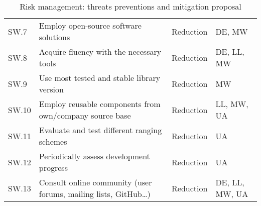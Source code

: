 \begin{table}[H]
\begin{tabular}{@{} m{3em} >{\small}m{20em} m{5em} m{8em} @{}}
    SW.7  & Employ open-source software solutions & Reduction & DE, MW \\
    SW.8  & Acquire fluency with the necessary tools & Reduction & DE, LL, MW \\
    SW.9  & Use most tested and stable library version & Reduction & MW \\
    SW.10  & Employ reusable components from own/company source base & Reduction & LL, MW, UA \\
    SW.11 & Evaluate and test different ranging schemes & Reduction & UA \\
    SW.12 & Periodically assess development progress & Reduction & UA \\
    SW.13 & Consult online community (user forums, mailing lists, GitHub\dots) & Reduction & DE, LL, MW, UA \\
    \bottomrule
\end{tabular}
\caption{Risk management: threats preventions and mitigation proposal}\label{tab:risk_mgmt}
\end{table}
